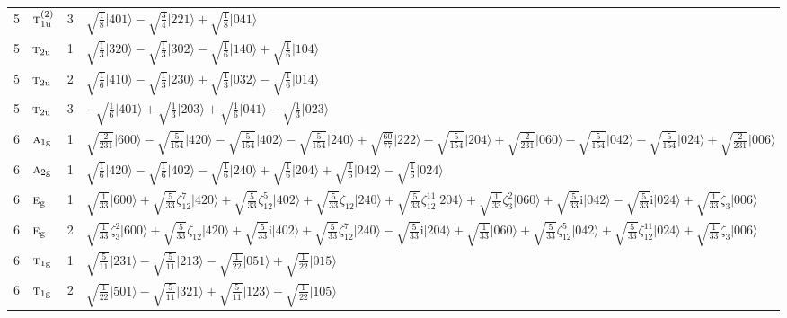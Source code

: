 \documentclass[11pt]{article}
\newcommand{\irr}[1]{\text{\normalfont\scshape #1}}
\newcommand{\ptag}[1]{\mathrm{#1}}
\newcommand{\iunit}{\mathrm{i}}
\newcommand{\rootunity}[1]{\zeta_{#1}}
\newcommand{\occ}[1]{\lvert #1\rangle}
\begin{document}
\begin{longtable}{c l c p{}}
5 & $\irr{t}_{1\ptag{u}}^{(2)}$ & 3 & $\sqrt{\tfrac{1}{8}}\occ{401}-\sqrt{\tfrac{3}{4}}\occ{221}+\sqrt{\tfrac{1}{8}}\occ{041}$\\
5 & $\irr{t}_{2\ptag{u}}$ & 1 & $\sqrt{\tfrac{1}{3}}\occ{320}-\sqrt{\tfrac{1}{3}}\occ{302}-\sqrt{\tfrac{1}{6}}\occ{140}+\sqrt{\tfrac{1}{6}}\occ{104}$\\
5 & $\irr{t}_{2\ptag{u}}$ & 2 & $\sqrt{\tfrac{1}{6}}\occ{410}-\sqrt{\tfrac{1}{3}}\occ{230}+\sqrt{\tfrac{1}{3}}\occ{032}-\sqrt{\tfrac{1}{6}}\occ{014}$\\
5 & $\irr{t}_{2\ptag{u}}$ & 3 & $-\sqrt{\tfrac{1}{6}}\occ{401}+\sqrt{\tfrac{1}{3}}\occ{203}+\sqrt{\tfrac{1}{6}}\occ{041}-\sqrt{\tfrac{1}{3}}\occ{023}$\\
\hline
6 & $\irr{a}_{1\ptag{g}}$ & 1 & $\sqrt{\tfrac{2}{231}}\occ{600}-\sqrt{\tfrac{5}{154}}\occ{420}-\sqrt{\tfrac{5}{154}}\occ{402}-\sqrt{\tfrac{5}{154}}\occ{240}+\sqrt{\tfrac{60}{77}}\occ{222}-\sqrt{\tfrac{5}{154}}\occ{204}+\sqrt{\tfrac{2}{231}}\occ{060}-\sqrt{\tfrac{5}{154}}\occ{042}-\sqrt{\tfrac{5}{154}}\occ{024}+\sqrt{\tfrac{2}{231}}\occ{006}$\\
6 & $\irr{a}_{2\ptag{g}}$ & 1 & $\sqrt{\tfrac{1}{6}}\occ{420}-\sqrt{\tfrac{1}{6}}\occ{402}-\sqrt{\tfrac{1}{6}}\occ{240}+\sqrt{\tfrac{1}{6}}\occ{204}+\sqrt{\tfrac{1}{6}}\occ{042}-\sqrt{\tfrac{1}{6}}\occ{024}$\\
6 & $\irr{e}_{\ptag{g}}$ & 1 & $\sqrt{\tfrac{1}{33}}\occ{600}+\sqrt{\tfrac{5}{33}}\rootunity{12}^{7}\occ{420}+\sqrt{\tfrac{5}{33}}\rootunity{12}^{5}\occ{402}+\sqrt{\tfrac{5}{33}}\rootunity{12}\occ{240}+\sqrt{\tfrac{5}{33}}\rootunity{12}^{11}\occ{204}+\sqrt{\tfrac{1}{33}}\rootunity{3}^{2}\occ{060}+\sqrt{\tfrac{5}{33}}\iunit\occ{042}-\sqrt{\tfrac{5}{33}}\iunit\occ{024}+\sqrt{\tfrac{1}{33}}\rootunity{3}\occ{006}$\\
6 & $\irr{e}_{\ptag{g}}$ & 2 & $\sqrt{\tfrac{1}{33}}\rootunity{3}^{2}\occ{600}+\sqrt{\tfrac{5}{33}}\rootunity{12}\occ{420}+\sqrt{\tfrac{5}{33}}\iunit\occ{402}+\sqrt{\tfrac{5}{33}}\rootunity{12}^{7}\occ{240}-\sqrt{\tfrac{5}{33}}\iunit\occ{204}+\sqrt{\tfrac{1}{33}}\occ{060}+\sqrt{\tfrac{5}{33}}\rootunity{12}^{5}\occ{042}+\sqrt{\tfrac{5}{33}}\rootunity{12}^{11}\occ{024}+\sqrt{\tfrac{1}{33}}\rootunity{3}\occ{006}$\\
6 & $\irr{t}_{1\ptag{g}}$ & 1 & $\sqrt{\tfrac{5}{11}}\occ{231}-\sqrt{\tfrac{5}{11}}\occ{213}-\sqrt{\tfrac{1}{22}}\occ{051}+\sqrt{\tfrac{1}{22}}\occ{015}$\\
6 & $\irr{t}_{1\ptag{g}}$ & 2 & $\sqrt{\tfrac{1}{22}}\occ{501}-\sqrt{\tfrac{5}{11}}\occ{321}+\sqrt{\tfrac{5}{11}}\occ{123}-\sqrt{\tfrac{1}{22}}\occ{105}$\\

\end{longtable}
\end{document}
